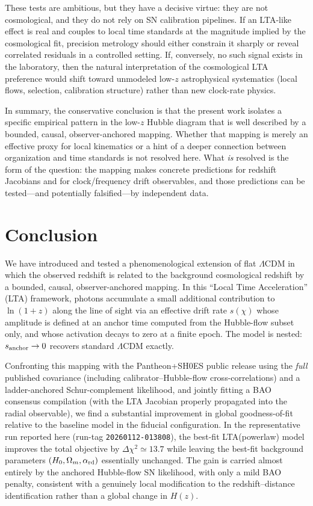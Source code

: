 \documentclass[10pt]{article}
\newcommand{\Hc}{H}
\begin{document}
These tests are ambitious, but they have a decisive virtue: they are not cosmological, and they do
not rely on SN calibration pipelines. If an LTA-like effect is real and couples to local time
standards at the magnitude implied by the cosmological fit, precision metrology should either
constrain it sharply or reveal correlated residuals in a controlled setting. If, conversely, no
such signal exists in the laboratory, then the natural interpretation of the cosmological LTA
preference would shift toward unmodeled low-$z$ astrophysical systematics (local flows, selection,
calibration structure) rather than new clock-rate physics.

In summary, the conservative conclusion is that the present work isolates a specific empirical
pattern in the low-$z$ Hubble diagram that is well described by a bounded, causal, observer-anchored
mapping. Whether that mapping is merely an effective proxy for local kinematics or a hint of a
deeper connection between organization and time standards is not resolved here. What \emph{is}
resolved is the form of the question: the mapping makes concrete predictions for redshift Jacobians
and for clock/frequency drift observables, and those predictions can be tested---and potentially
falsified---by independent data.

\section{Conclusion}
\label{sec:conclusion}

We have introduced and tested a phenomenological extension of flat $\Lambda$CDM in which the observed
redshift is related to the background cosmological redshift by a bounded, causal, observer-anchored
mapping. In this ``Local Time Acceleration'' (LTA) framework, photons accumulate a small additional
contribution to $\ln(1+z)$ along the line of sight via an effective drift rate $s(\chi)$ whose
amplitude is defined at an anchor time computed from the Hubble-flow subset only, and whose
activation decays to zero at a finite epoch. The model is nested: $s_{\rm anchor}\rightarrow 0$
recovers standard $\Lambda$CDM exactly.

Confronting this mapping with the Pantheon+SH0ES public release using the \emph{full} published
covariance (including calibrator--Hubble-flow cross-correlations) and a ladder-anchored
Schur-complement likelihood, and jointly fitting a BAO consensus compilation \cite{DESI2024BAO} (with the LTA Jacobian
properly propagated into the radial observable), we find a substantial improvement in global
goodness-of-fit relative to the baseline model in the fiducial configuration. In the representative
run reported here (run-tag \texttt{20260112-013808}), the best-fit LTA(powerlaw) model improves the
total objective by $\Delta\chi^2 \simeq 13.7$ while leaving the best-fit background parameters
$(H_0,\Omega_m,\alpha_{\rm rd})$ essentially unchanged. The gain is carried almost entirely by the
anchored Hubble-flow SN likelihood, with only a mild BAO penalty, consistent with a genuinely local
modification to the redshift--distance identification rather than a global change in $\Hc(z)$.
\end{document}
